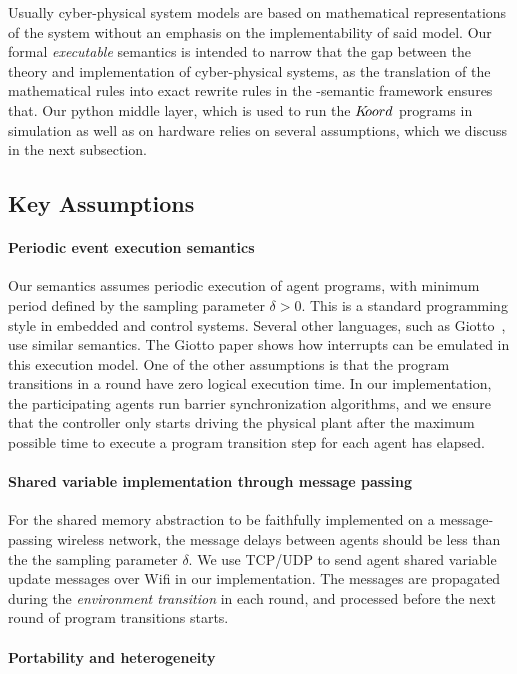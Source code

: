 Usually cyber-physical system models are based on mathematical representations of the system without an emphasis on the implementability of said model. Our formal \emph{executable} semantics is intended to narrow that the gap between the theory and implementation of cyber-physical systems, as the translation of the mathematical rules into exact rewrite rules in the \K-semantic framework ensures that. Our python middle layer, which is used to run the $K\kern-2pt oord$ programs in simulation as well as on hardware relies on several assumptions, which we discuss in the next subsection.



\subsection{Key Assumptions} 

\paragraph*{Periodic event execution semantics}
 Our semantics assumes periodic execution of agent programs, with minimum period defined by the sampling parameter $\delta>0$. This is a standard programming style in embedded and control systems. Several other languages, such as Giotto~\cite{henzinger2003giotto}, use similar semantics. The Giotto paper shows how interrupts can be emulated in this execution model. One of the other assumptions is that the program transitions in a round have  zero logical execution time. In our implementation, the participating agents run barrier synchronization algorithms, and we ensure that the controller only starts driving the physical plant after the maximum possible time to execute a program transition step for each agent has elapsed. 


\paragraph*{Shared variable implementation through message passing}
For the shared memory abstraction to be faithfully implemented on a message-passing wireless network, the message delays between agents should be less than the the sampling parameter $\delta$. We use TCP/UDP to send agent shared variable update messages over Wifi in our implementation. The messages are propagated during the \emph{environment transition} in each round, and processed before the next round of program transitions starts.

\paragraph*{Portability and heterogeneity}

